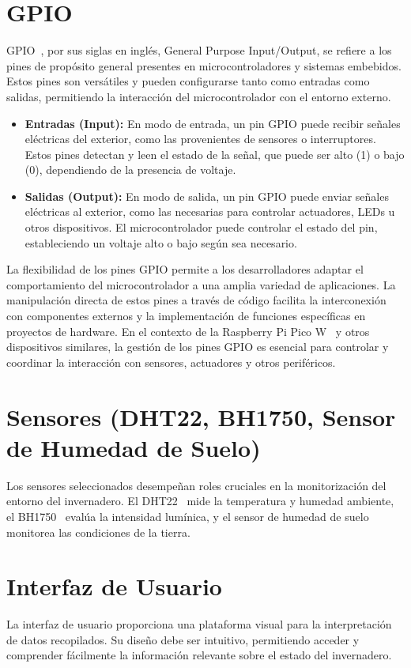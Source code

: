 \section{GPIO}\label{concepto:GPIO}
GPIO~\cite{misc:gpio}, por sus siglas en inglés, General Purpose Input/Output, se refiere a los pines de propósito general presentes en microcontroladores y sistemas embebidos. Estos pines son versátiles y pueden configurarse tanto como entradas como salidas, permitiendo la interacción del microcontrolador con el entorno externo.
\begin{itemize}
	\item \textbf{Entradas (Input):} En modo de entrada, un pin GPIO puede recibir señales eléctricas del exterior, como las provenientes de sensores o interruptores. Estos pines detectan y leen el estado de la señal, que puede ser alto (1) o bajo (0), dependiendo de la presencia de voltaje.

	\item \textbf{Salidas (Output):} En modo de salida, un pin GPIO puede enviar señales eléctricas al exterior, como las necesarias para controlar actuadores, LEDs u otros dispositivos. El microcontrolador puede controlar el estado del pin, estableciendo un voltaje alto o bajo según sea necesario.
\end{itemize}
La flexibilidad de los pines GPIO permite a los desarrolladores adaptar el comportamiento del microcontrolador a una amplia variedad de aplicaciones. La manipulación directa de estos pines a través de código facilita la interconexión con componentes externos y la implementación de funciones específicas en proyectos de hardware. En el contexto de la Raspberry Pi Pico W~\cite{misc:RPiPicoW} y otros dispositivos similares, la gestión de los pines GPIO es esencial para controlar y coordinar la interacción con sensores, actuadores y otros periféricos.

\section{Sensores (DHT22, BH1750, Sensor de Humedad de Suelo)}
Los sensores seleccionados desempeñan roles cruciales en la monitorización del entorno del invernadero. El DHT22~\cite{manual:DHT22} mide la temperatura y humedad ambiente, el BH1750~\cite{manual:BH1750} evalúa la intensidad lumínica, y el sensor de humedad de suelo~\cite{wiki:SensorHumedadSuelo} monitorea las condiciones de la tierra.

\section{Interfaz de Usuario}
La interfaz de usuario proporciona una plataforma visual para la interpretación de datos recopilados. Su diseño debe ser intuitivo, permitiendo acceder y comprender fácilmente la información relevante sobre el estado del invernadero.

